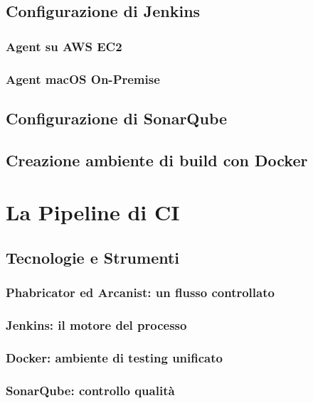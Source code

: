 \documentclass[a4paper,12pt]{report}
\begin{document}
	\section{Configurazione di Jenkins}
	
	\subsection{Agent su AWS EC2}
	
	\subsection{Agent macOS On-Premise}
	
	\section{Configurazione di SonarQube}
	
	\section{Creazione ambiente di build con Docker}
	
	\chapter{La Pipeline di CI}
	
	\section{Tecnologie e Strumenti}
	
	\subsection{Phabricator ed Arcanist: un flusso controllato}
	
	\subsection{Jenkins: il motore del processo}
	
	\subsection{Docker: ambiente di testing unificato}
	
	\subsection{SonarQube: controllo qualità}
	
\end{document}
